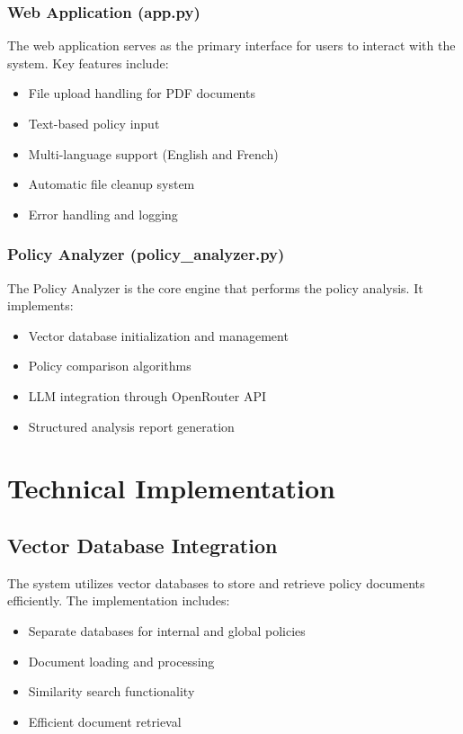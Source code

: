 \documentclass[11pt,a4paper]{article}
\begin{document}
\subsubsection{Web Application (app.py)}
The web application serves as the primary interface for users to interact with the system. Key features include:
\begin{itemize}
    \item File upload handling for PDF documents
    \item Text-based policy input
    \item Multi-language support (English and French)
    \item Automatic file cleanup system
    \item Error handling and logging
\end{itemize}

\subsubsection{Policy Analyzer (policy\_analyzer.py)}
The Policy Analyzer is the core engine that performs the policy analysis. It implements:
\begin{itemize}
    \item Vector database initialization and management
    \item Policy comparison algorithms
    \item LLM integration through OpenRouter API
    \item Structured analysis report generation
\end{itemize}

\section{Technical Implementation}
\subsection{Vector Database Integration}
The system utilizes vector databases to store and retrieve policy documents efficiently. The implementation includes:
\begin{itemize}
    \item Separate databases for internal and global policies
    \item Document loading and processing
    \item Similarity search functionality
    \item Efficient document retrieval
\end{itemize}
\end{document}
